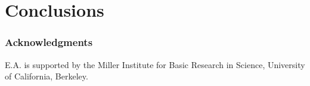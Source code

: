 \section{Conclusions}

\subsubsection*{Acknowledgments}

E.A. is supported by the Miller Institute for Basic Research in Science,
University of California, Berkeley.



